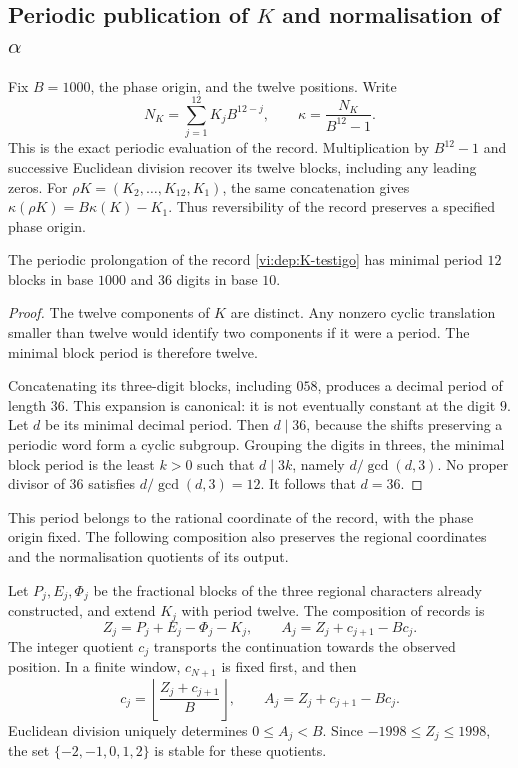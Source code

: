\subsection{\texorpdfstring{Periodic publication of \(K\) and normalisation of \(\alpha\)}{Periodic publication of K and normalisation of alpha}}
\label{vi:dep:alpha}

Fix \(B=1000\), the phase origin, and the twelve positions. Write
\[
 N_K=\sum_{j=1}^{12}K_jB^{12-j},\qquad
 \kappa=\frac{N_K}{B^{12}-1}.
\]
This is the exact periodic evaluation of the record. Multiplication
by \(B^{12}-1\) and successive Euclidean division recover its twelve
blocks, including any leading zeros. For
\(\rho K=(K_2,\ldots,K_{12},K_1)\), the same concatenation gives
\(\kappa(\rho K)=B\kappa(K)-K_1\). Thus reversibility
of the record preserves a specified phase origin.

\begin{proposition}
\label{vi:dep:periodo-minimo-k}
The periodic prolongation of the record \eqref{vi:dep:K-testigo}
has minimal period \(12\) blocks in base \(1000\) and
\(36\) digits in base \(10\).
\end{proposition}
\begin{proof}
The twelve components of \(K\) are distinct. Any nonzero cyclic
translation smaller than twelve would identify two components if it were
a period. The minimal block period is therefore twelve.

Concatenating its three-digit blocks, including \(058\),
produces a decimal period of length \(36\). This expansion is
canonical: it is not eventually constant at the digit \(9\).
Let \(d\) be its minimal decimal period. Then \(d\mid36\),
because the shifts preserving a periodic word form
a cyclic subgroup. Grouping the digits in threes, the minimal
block period is the least \(k>0\) such that \(d\mid3k\), namely
\(d/\gcd(d,3)\). No proper divisor of \(36\)
satisfies \(d/\gcd(d,3)=12\). It follows that \(d=36\).
\end{proof}

This period belongs to the rational coordinate of the record, with the
phase origin fixed. The following composition also preserves the
regional coordinates and the normalisation quotients of its output.

Let \(P_j,E_j,\Phi_j\) be the fractional blocks of the three
regional characters already constructed, and extend \(K_j\) with period
twelve. The composition of records is
\begin{equation}
 Z_j=P_j+E_j-\Phi_j-K_j,
 \qquad
 A_j=Z_j+c_{j+1}-Bc_j.
 \label{vi:dep:normalizacion-alpha}
\end{equation}
The integer quotient \(c_j\) transports the continuation towards the observed
position. In a finite window, \(c_{N+1}\) is fixed first, and then
\[
 c_j=\left\lfloor\frac{Z_j+c_{j+1}}B\right\rfloor,
 \qquad A_j=Z_j+c_{j+1}-Bc_j.
\]
Euclidean division uniquely determines \(0\le A_j<B\).
Since \(-1998\le Z_j\le1998\), the set
\(\{-2,-1,0,1,2\}\) is stable for these quotients.

